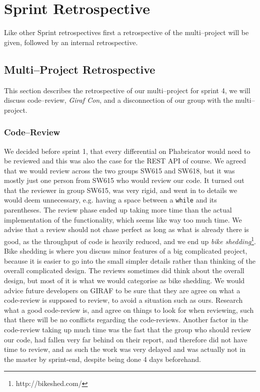 \section{Sprint Retrospective}
\label{sec:S4retro} %

Like other Sprint retrospectives first a retrospective of the multi--project will be given, followed by an internal retrospective.

\subsection*{Multi--Project Retrospective}
This section describes the retrospective of our multi--project for sprint 4, we will discuss code--review, \textit{Giraf Con}, and a disconnection of our group with the multi--project.

\subsubsection*{Code--Review}
We decided before sprint 1, that every differential on Phabricator would need to be reviewed and this was also the case for the REST API of course.
We agreed that we would review across the two groups SW615 and SW618, but it was mostly just one person from SW615 who would review our code.
It turned out that the reviewer in group SW615, was very rigid, and went in to details we would deem unnecessary, e.g. having a space between a \texttt{while} and its parentheses.
The review phase ended up taking more time than the actual implementation of the functionality, which seems like way too much time.
We advise that a review should not chase perfect as long as what is already there is good, as the throughput of code is heavily reduced, and we end up \textit{bike shedding}\footnote{http://bikeshed.com/}.
Bike shedding is where you discuss minor features of a big complicated project, because it is easier to go into the small simpler details rather than thinking of the overall complicated design.
The reviews sometimes did think about the overall design, but most of it is what we would categorise as bike shedding.
We would advice future developers on GIRAF to be sure that they are agree on what a code-review is supposed to review, to avoid a situation such as ours.
Research what a good code-review is, and agree on things to look for when reviewing, such that there will be no conflicts regarding the code-reviews.
Another factor in the code-review taking up much time was the fast that the group who should review our code, had fallen very far behind on their report, and therefore did not have time to review, and as such the work was very delayed and was actually not in the master by sprint-end, despite being done 4 days beforehand.


